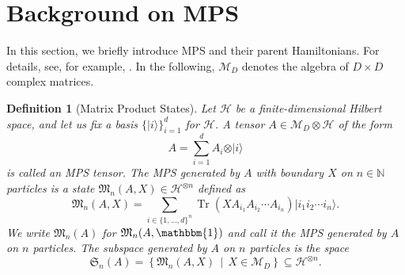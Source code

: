 \documentclass[a4paper]{article}
\newcommand{\ket}[1]{\vert #1 \rangle}
\newcommand{\tr}{\operatorname{Tr}}
\newcommand{\id}{\mathbbm{1}}
\newtheorem{definition}[theorem]{Definition}
\theoremstyle{definition}
\begin{document}
\section{Background on MPS}\label{sec:background}

In this section, we briefly introduce MPS and their parent Hamiltonians. For details, see, for example, \cite{Cirac2021}. In the following, $\mathcal{M}_D$ denotes the algebra of $D\times D$ complex matrices. 

\begin{definition}[Matrix Product States]
    Let $\mathcal{H}$ be a finite-dimensional Hilbert space, and let us fix a basis $\{\ket{i}\}_{i=1}^d$ for $\mathcal{H}$. A tensor $A\in\mathcal{M}_D \otimes \mathcal{H}$ of the form 
    \begin{equation*}
    A = \sum_{i=1}^d A_i \otimes \ket{i}
    \end{equation*}
    is called an MPS tensor. The \emph{MPS generated by $A$ with boundary $X$} on $n\in\mathbb N$ particles is a state 
    $\mathfrak{M}_n(A,X)\in \mathcal{H}^{\otimes n}$ defined as 
    \begin{equation*}
        \mathfrak{M}_n(A,X) = \sum_{i\in \{1, \dots, d\}^n} \tr\left( X A_{i_1} A_{i_2} \cdots A_{i_n}\right) \ket{i_1 i_2 \cdots i_n}.
    \end{equation*}
    We write $\mathfrak{M}_n(A)$ for $\mathfrak{M}_n(A,\id)$ and call it the \emph{MPS generated by $A$} on $n$ particles. The \emph{subspace generated by $A$} on $n$ particles is the space
    \begin{equation*}
        \mathfrak{S}_n(A) = \left\{ \mathfrak{M}_n(A,X) \,\middle| \, X\in\mathcal{M}_D\right\} \subseteq \mathcal{H}^{\otimes n}.
    \end{equation*}
\end{definition}
\end{document}
